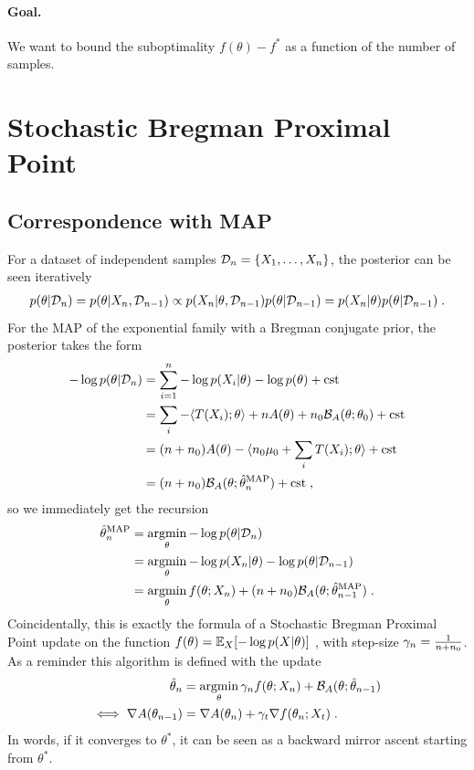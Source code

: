 \documentclass{article}
\newcommand{\logpart}{A}
\newcommand{\bregman}{\cB_\logpart}
\newcommand{\natp}{\theta}
\newcommand{\lr}{\gamma} %
\begin{document}
\paragraph{Goal.} We want to bound the suboptimality $f(\natp) - f^*$ as a function of the number of samples. 

\section{Stochastic Bregman Proximal Point}
\subsection{Correspondence with MAP}
For a dataset of independent samples ${\mathcal D}_n = \{X_1,\dots,X_n\}$, the posterior can be seen iteratively
\begin{align}
	p(\natp |\cD_n)
	=p(\natp|X_n,\cD_{n-1})
	\propto p(X_n|\natp,\cD_{n-1}) p(\natp|\cD_{n-1})
	=p(X_n|\natp)p(\natp |\cD_{n-1}) \; .
\end{align}
For the MAP of the exponential family with a Bregman conjugate prior, the posterior takes the form
\begin{align}
	- \log p(\natp | \cD_n) 
	&= \sum_{i=1}^n -\log p(X_i | \natp) - \log p(\natp) + \cst\\
	&= \sum_i - \langle T(X_i) ; \natp \rangle  + n \logpart(\natp) + n_0 \bregman(\natp ; \natp_0) +\cst \\
	&= (n+n_0)\logpart(\natp)  - \langle n_0 \mu_0 + \sum_i T(X_i) ; \natp \rangle + \cst \\
	&= (n+n_0) \bregman(\natp; \hat \natp_n^\text{MAP}) + \cst \; ,
\end{align}
so we immediately get the recursion
\begin{align}
    \hat \natp_n^\text{MAP}
    &= \argmin_\natp - \log p(\natp | \cD_n) \\
    &= \argmin_\natp - \log p(X_n|\natp) - \log p(\natp | \cD_{n-1}) \\
    &= \argmin_\natp f(\natp; X_{n}) + (n+n_0) \bregman(\natp; \hat \natp_{n-1}^\text{MAP})  \; .
    \label{eq:SBPP}
\end{align} 
Coincidentally, this is exactly the formula of a Stochastic Bregman Proximal Point update on the function $f(\natp) = \E_X[-\log p(X|\natp)]$ , with step-size $\lr_n = \inv{n+n_0}$. As a reminder this algorithm is defined with the update
\begin{align}
	 \hat \natp_n
    &= \argmin_\natp \lr_n f(\natp; X_{n}) + \bregman(\natp; \hat \natp_{n-1}) \\
    \iff \nabla \logpart(\natp_{n-1}) &= \nabla\logpart(\natp_n) + \lr_t \nabla f(\natp_n ; X_t) \; .
\end{align}
In words, if it converges to $\natp^*$, it can be seen as a backward mirror ascent starting from $\natp^*$.
\end{document}
